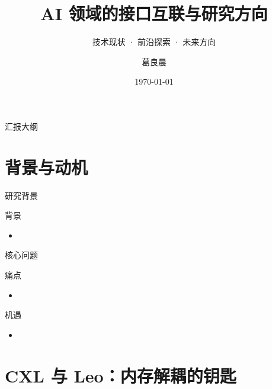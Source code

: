 \documentclass[aspectratio=169, 8pt, UTF8]{ctexbeamer}
\title[AI 接口互联研究]{AI 领域的接口互联与研究方向}
\subtitle{技术现状 · 前沿探索 · 未来方向}
\author[葛良晨]{葛良晨}
\institute[]{组会汇报}
\date{\today}
\begin{document}
\begin{frame}
  \titlepage
\end{frame}

\begin{frame}{汇报大纲}
  \tableofcontents
\end{frame}

\section{背景与动机}

\begin{frame}{研究背景}
  \begin{block}{背景}
    \begin{itemize}
      \item
    \end{itemize}
  \end{block}
\end{frame}

\begin{frame}{核心问题}
  \begin{alertblock}{痛点}
    \begin{itemize}
      \item
    \end{itemize}
  \end{alertblock}

  \begin{exampleblock}{机遇}
    \begin{itemize}
      \item
    \end{itemize}
  \end{exampleblock}
\end{frame}

\section{CXL 与 Leo：内存解耦的钥匙}
\end{document}
